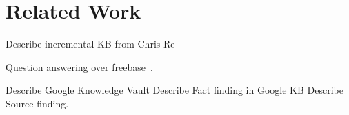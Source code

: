 

\section{Related Work}

Describe incremental KB from Chris Re

Question answering over freebase~\cite{yao2014information}.

Describe Google Knowledge Vault 
Describe Fact finding in Google KB
Describe Source finding.


